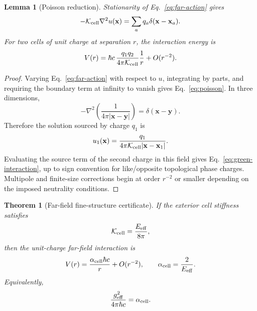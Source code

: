 \documentclass[11pt]{article}
\newcommand{\Eeff}{E_{\rm eff}}
\newcommand{\alphacell}{\alpha_{\rm cell}}
\newcommand{\Kcell}{\mathcal K_{\rm cell}}
\newtheorem{theorem}{Theorem}
\newtheorem{lemma}{Lemma}
\begin{document}
\begin{lemma}[Poisson reduction]
Stationarity of Eq.~\eqref{eq:far-action} gives
\begin{equation}
-\Kcell \nabla^2 u(\mathbf x)=\sum_a q_a\delta(\mathbf x-\mathbf x_a).
\label{eq:poisson}
\end{equation}
For two cells of unit charge at separation \(r\), the interaction energy is
\begin{equation}
V(r)=\hbar c\,\frac{q_1q_2}{4\pi\Kcell}\frac{1}{r}+O(r^{-2}).
\label{eq:green-interaction}
\end{equation}
\end{lemma}

\begin{proof}
Varying Eq.~\eqref{eq:far-action} with respect to \(u\), integrating by parts, and requiring the boundary term at infinity to vanish gives Eq.~\eqref{eq:poisson}. In three dimensions,
\begin{equation}
-\nabla^2\left(\frac{1}{4\pi |\mathbf x-\mathbf y|}\right)=\delta(\mathbf x-\mathbf y).
\end{equation}
Therefore the solution sourced by charge \(q_1\) is
\begin{equation}
u_1(\mathbf x)=\frac{q_1}{4\pi\Kcell |\mathbf x-\mathbf x_1|}.
\end{equation}
Evaluating the source term of the second charge in this field gives Eq.~\eqref{eq:green-interaction}, up to sign convention for like/opposite topological phase charges. Multipole and finite-size corrections begin at order \(r^{-2}\) or smaller depending on the imposed neutrality conditions.
\end{proof}

\begin{theorem}[Far-field fine-structure certificate]
\label{thm:farfield}
If the exterior cell stiffness satisfies
\begin{equation}
\Kcell=\frac{\Eeff}{8\pi},
\label{eq:Kcell}
\end{equation}
then the unit-charge far-field interaction is
\begin{equation}
V(r)=\frac{\alphacell\hbar c}{r}+O(r^{-2}),
\qquad
\alphacell=\frac{2}{\Eeff}.
\label{eq:far-alpha}
\end{equation}
Equivalently,
\begin{equation}
\frac{g_{\rm eff}^2}{4\pi\hbar c}=\alphacell.
\label{eq:geff-alpha}
\end{equation}
\end{theorem}
\end{document}
